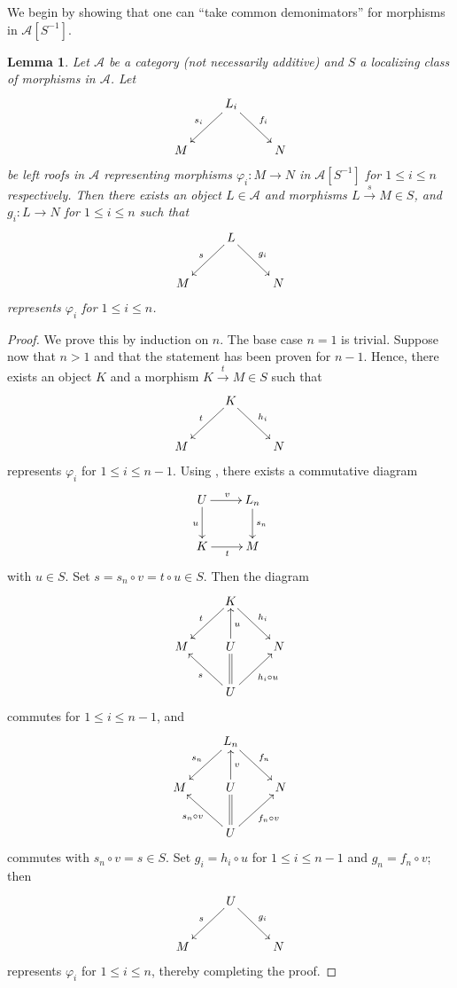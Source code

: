 \documentclass[11pt]{article}
\theoremstyle{thmstyle}
\newtheorem{lemma}[theorem]{Lemma}
\theoremstyle{defstyle}
\newcommand{\scrA}{\mathscr{A}}
\renewcommand{\le}{\leqslant}
\begin{document}
We begin by showing that one can ``take common demonimators'' for morphisms in $\scrA[S^{-1}]$.
\begin{lemma}
	Let $\scrA$ be a category (not necessarily additive) and $S$ a localizing class of morphisms in $\scrA$. Let 
	\begin{equation*}
		\xymatrix {
			& L_i\ar[ld]_{s_i}\ar[rd]^{f_i} &\\
			M && N
		}
	\end{equation*}
	be left roofs in $\scrA$ representing morphisms $\varphi_i\colon M\to N$ in $\scrA[S^{-1}]$ for $1\le i\le n$ respectively. Then there exists an object $L\in\scrA$ and morphisms $L\xrightarrow{s} M\in S$, and $g_i\colon L\to N$ for $1\le i\le n$ such that 
	\begin{equation*}
		\xymatrix {
			& L\ar[ld]_s\ar[rd]^{g_i} & \\
			M && N
		}
	\end{equation*}
	represents $\varphi_i$ for $1\le i\le n$.
\end{lemma}
\begin{proof}
	We prove this by induction on $n$. The base case $n = 1$ is trivial. Suppose now that $n > 1$ and that the statement has been proven for $n - 1$. Hence, there exists an object $K$ and a morphism $K\xrightarrow{t} M\in S$ such that 
	\begin{equation*}
		\xymatrix {
			& K\ar[rd]^{h_i}\ar[ld]_t & \\
			M & & N
		}
	\end{equation*}
	represents $\varphi_i$ for $1\le i\le n - 1$. Using , there exists a commutative diagram 
	\begin{equation*}
		\xymatrix {
			U\ar[r]^{v}\ar[d]_{u} & L_n\ar[d]^{s_n}\\
			K\ar[r]_{t} & M
		}
	\end{equation*}
	with $u\in S$. Set $s = s_n\circ v = t\circ u\in S$. Then the diagram 
	\begin{equation*}
		\xymatrix {
			& K\ar[ld]_t\ar[rd]^{h_i} & \\
			M & U\ar[u]_u\ar@{=}[d] & N\\
			& U\ar[lu]^s\ar[ru]_{h_i\circ u} & 
		}
	\end{equation*}
	commutes for $1\le i\le n - 1$, and 
	\begin{equation*}
		\xymatrix {
			& L_n\ar[rd]^{f_n}\ar[ld]_{s_n} & \\
			M & U\ar[u]_{v}\ar@{=}[d] & N\\
			& U\ar[lu]^{s_n\circ v}\ar[ru]_{f_n\circ v} & 
		}
	\end{equation*}
	commutes with $s_n\circ v = s\in S$. Set $g_i = h_i\circ u$ for $1\le i\le n - 1$ and $g_n = f_n\circ v$; then 
	\begin{equation*}
		\xymatrix {
			& U\ar[ld]_s\ar[rd]^{g_i} & \\
			M && N
		}
	\end{equation*}
	represents $\varphi_i$ for $1\le i\le n$, thereby completing the proof.
\end{proof}
\end{document}
